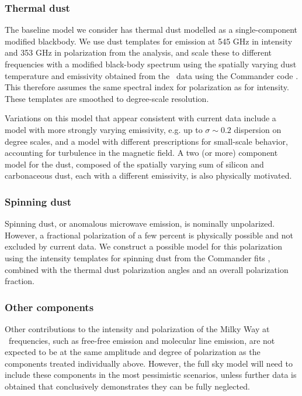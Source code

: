\subsubsection{Thermal dust}
The baseline model we consider has thermal dust modelled as a single-component modified  blackbody. We use dust templates for emission at 545 GHz in intensity and 
 353 GHz in polarization from the  analysis, and scale these to different  frequencies with a modified black-body spectrum using the spatially varying dust temperature and emissivity obtained from the \planck\ data using the Commander code \cite{Adam:2015wua}. This therefore assumes the same spectral index for  polarization as for intensity.  These templates are smoothed to degree-scale resolution.

Variations on this model that appear consistent with current data include a model with more strongly varying emissivity, e.g. up to $\sigma \sim 0.2$ dispersion on degree scales, and a model with different prescriptions for small-scale behavior, accounting for turbulence in the magnetic field. A two (or more) component model for the dust, composed of the spatially varying sum of silicon and carbonaceous dust, each with a different emissivity, is also physically motivated.

\subsubsection{Spinning dust}
Spinning dust, or anomalous microwave emission, is nominally unpolarized. However, a fractional polarization of a few percent is physically possible and not excluded by current data. We construct a possible model for this polarization using the intensity templates for spinning dust from the  Commander fits
\cite{Adam:2015wua}, combined with the thermal dust polarization angles and an overall polarization fraction.

\subsubsection{Other components}
Other contributions to the intensity and polarization of the Milky Way at \cmbexp\ frequencies, such as 
free-free emission and molecular line emission, are not expected to be at the same amplitude and degree
of polarization as the components treated individually above. However, the full sky model will need to include
these components in the most pessimistic scenarios, unless further data is obtained that 
conclusively demonstrates they can be fully neglected.

